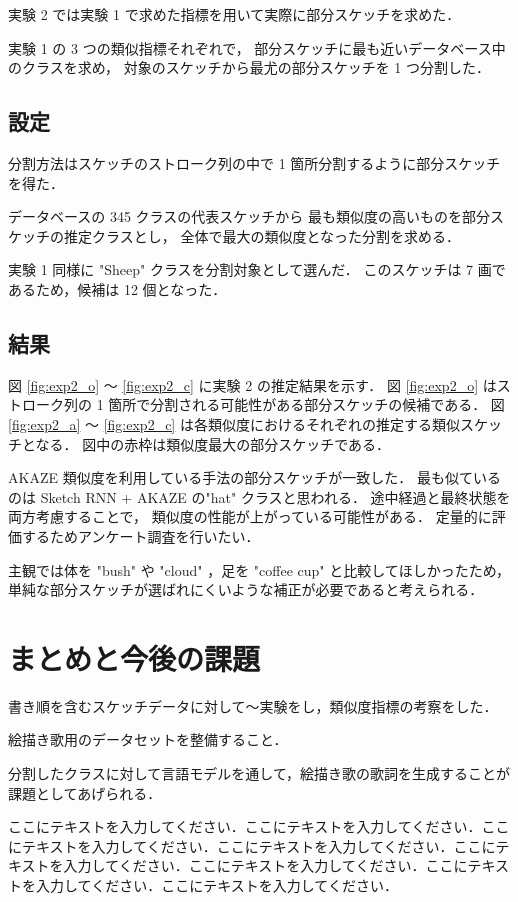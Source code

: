 \documentclass[twocolumn]{jarticle}     %
\begin{document}
実験 2 では実験 1 で求めた指標を用いて実際に部分スケッチを求めた．

実験 1 の 3 つの類似指標それぞれで，
部分スケッチに最も近いデータベース中のクラスを求め，
対象のスケッチから最尤の部分スケッチを 1 つ分割した．

\subsection{設定}
分割方法はスケッチのストローク列の中で 1 箇所分割するように部分スケッチを得た．

データベースの 345 クラスの代表スケッチから
最も類似度の高いものを部分スケッチの推定クラスとし，
全体で最大の類似度となった分割を求める．

実験 1 同様に "Sheep" クラスを分割対象として選んだ．
このスケッチは 7 画であるため，候補は 12 個となった．

\subsection{結果}

図 \ref{fig:exp2_o} ～ \ref{fig:exp2_c} に実験 2 の推定結果を示す．
図 \ref{fig:exp2_o} はストローク列の 1 箇所で分割される可能性がある部分スケッチの候補である．
図 \ref{fig:exp2_a} ～ \ref{fig:exp2_c} は各類似度におけるそれぞれの推定する類似スケッチとなる．
図中の赤枠は類似度最大の部分スケッチである．

AKAZE 類似度を利用している手法の部分スケッチが一致した．
最も似ているのは Sketch RNN + AKAZE の"hat" クラスと思われる．
途中経過と最終状態を両方考慮することで，
類似度の性能が上がっている可能性がある．
定量的に評価するためアンケート調査を行いたい．

主観では体を "bush" や "cloud" ，足を "coffee cup" と比較してほしかったため，
単純な部分スケッチが選ばれにくいような補正が必要であると考えられる．

\section{まとめと今後の課題}
書き順を含むスケッチデータに対して～実験をし，類似度指標の考察をした．

絵描き歌用のデータセットを整備すること．

分割したクラスに対して言語モデルを通して，絵描き歌の歌詞を生成することが課題としてあげられる．

ここにテキストを入力してください．ここにテキストを入力してください．ここにテキストを入力してください．ここにテキストを入力してください．ここにテキストを入力してください．ここにテキストを入力してください．ここにテキストを入力してください．ここにテキストを入力してください．



\end{document}
